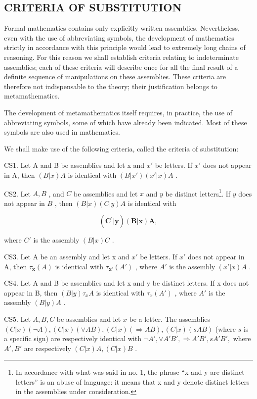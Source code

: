 \subsection{CRITERIA OF SUBSTITUTION}

Formal mathematics contains only explicitly written assemblies. Nevertheless, even with the use of abbreviating symbols, the development of mathematics strictly in accordance with this principle would lead to extremely long chains of reasoning. For this reason we shall establish criteria relating to indeterminate assemblies; each of these criteria will describe once for all the final result of a definite sequence of manipulations on these assemblies. These criteria are therefore not indispensable to the theory; their justification belongs to metamathematics.

The development of metamathematics itself requires, in practice, the use of abbreviating symbols, some of which have already been indicated. Most of these symbols are also used in mathematics.

We shall make use of the following criteria, called the criteria of substitution:

CS1. Let A and B be assemblies and let x and \(x'\) be letters. If \(x'\) does not appear in A, then \((B|x)A\) is identical with \((B|x')(x'|x)A\) .

CS2. Let \(A, B\) , and \(C\) be assemblies and let \(x\) and \(y\) be distinct letters\footnote{In accordance with what was said in no. 1, the phrase ``x and y are distinct letters'' is an abuse of language: it means that x and y denote distinct letters in the assemblies under consideration.}. If \(y\) does not appear in \(B\) , then \((B|x)(C|y)A\) is identical with

\[
\left(\boldsymbol {C} ^ {\prime} | \boldsymbol {y}\right) (\boldsymbol {B} | \boldsymbol {x}) \boldsymbol {A},
\]

where \(C'\) is the assembly \((B|x)C\) .

CS3. Let A be an assembly and let x and \(x'\) be letters. If \(x'\) does not appear in A, then \(\tau_{\mathbf{x}}(A)\) is identical with \(\tau_{\mathbf{x}'}(A')\) , where \(A'\) is the assembly \((x'|x)A\) .

CS4. Let A and B be assemblies and let x and y be distinct letters. If x does not appear in B, then \((B|y)\tau_{x}A\) is identical with \(\tau_{x}(A')\) , where \(A'\) is the assembly \((B|y)A\) .

CS5. Let \(A, B, C\) be assemblies and let \(x\) be a letter. The assemblies \((C|x) (\neg A), (C|x) (\vee AB), (C|x) (\Longrightarrow AB), (C|x) (sAB)\) (where \(s\) is a specific sign) are respectively identical with \(\neg A', \vee A'B', \Longrightarrow A'B', sA'B',\) where \(A', B'\) are respectively \((C|x) A, (C|x) B\) .


